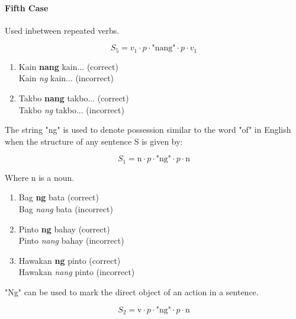 \paragraph{Fifth Case} Used inbetween repeated verbs.

\[
      S_5 = v_1 \cdot p \cdot \text{"nang"} \cdot p \cdot v_1
\]

\begin{example}

\end{example}

\begin{enumerate}
      \item Kain \textbf{nang} kain... (correct)
            \\ Kain \textit{ng} kain... (incorrect)
      \item Takbo \textbf{nang} takbo... (correct)
            \\ Takbo \textit{ng} takbo... (incorrect)
\end{enumerate}

The string "ng" is used to denote possession similar to
the word "of" in English when the structure of any sentence S is given by:

\[
      S_1 = \text{n} \cdot p \cdot \text{"ng"} \cdot p \cdot \text{n}
\]

Where n is a noun.

\begin{example}

\end{example}

\begin{enumerate}
      \item Bag \textbf{ng} bata (correct)
            \\ Bag \textit{nang} bata (incorrect)
      \item Pinto \textbf{ng} bahay (correct)
            \\ Pinto \textit{nang} bahay (incorrect)
      \item Hawakan \textbf{ng} pinto (correct)
            \\ Hawakan \textit{nang} pinto (incorrect)
\end{enumerate}

"Ng" can be used to mark the direct object of an action in a sentence.

\[
      S_2 = \text{v} \cdot p \cdot \text{"ng"} \cdot p \cdot \text{n}
\]

\begin{example}

\end{example}

